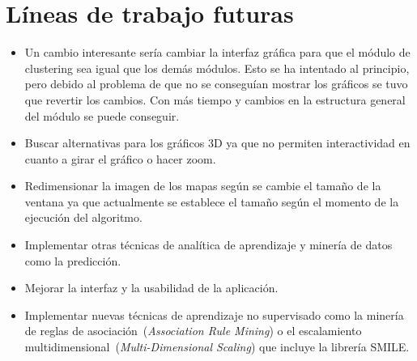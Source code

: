 \section{Líneas de trabajo futuras}

\begin{itemize}
    \item Un cambio interesante sería cambiar la interfaz gráfica para que el módulo de clustering sea igual que los demás módulos. Esto se ha intentado al principio, pero debido al problema de que no se conseguían mostrar los gráficos se tuvo que revertir los cambios. Con más tiempo y cambios en la estructura general del módulo se puede conseguir.
    \item Buscar alternativas para los gráficos 3D ya que no permiten interactividad en cuanto a girar el gráfico o hacer zoom.
    \item Redimensionar la imagen de los mapas según se cambie el tamaño de la ventana ya que actualmente se establece el tamaño según el momento de la ejecución del algoritmo.
    \item Implementar otras técnicas de analítica de aprendizaje y minería de datos como la predicción.
    \item Mejorar la interfaz y la usabilidad de la aplicación.
    \item Implementar nuevas técnicas de aprendizaje no supervisado como la minería de reglas de asociación~(\emph{Association Rule Mining}) o el escalamiento multidimensional~(\emph{Multi-Dimensional Scaling}) que incluye la librería SMILE.
\end{itemize}